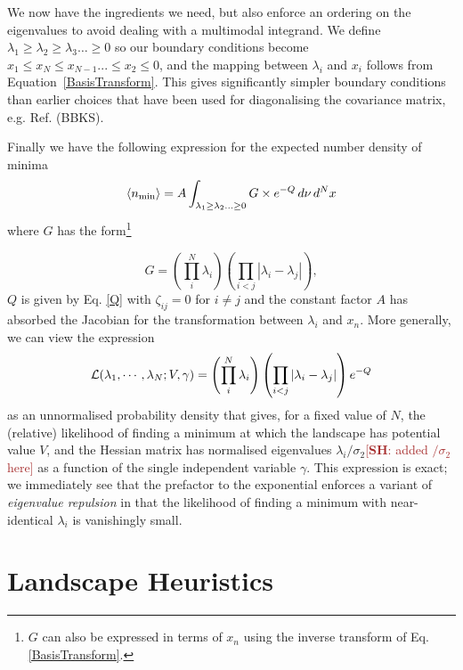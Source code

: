 \documentclass[12pt]{article}
\newcommand{\SH}[1]{\textcolor{brown}{[{\bf SH}: #1]}}
\begin{document}
We now have  the ingredients we  need, but  also enforce an ordering on the eigenvalues to avoid dealing with a multimodal integrand.  We define  $\lambda_1 \geq \lambda_2 \geq \lambda_3 \ldots \geq 0$ so our boundary conditions become $x_1\leq x_N\leq x_{N-1} ... \leq x_2 \leq 0$, and the mapping between $\lambda_i$ and $x_i$  follows from Equation~\ref{BasisTransform}. This gives significantly simpler boundary conditions than earlier choices that have been used for diagonalising the covariance matrix, e.g. Ref.\cite{BBKS} (BBKS).

Finally we have the following expression for the expected number density of minima 
%
\begin{equation} \label{DensityOfPeaks}
\langle n_{{\rm min}} \rangle = A \int_{\lambda_1 \geq \lambda_2 \ldots \geq 0} G \times e^{-Q} \, d\nu \,d^Nx
\end{equation}
%
\noindent where $G$ has the form\footnote{$G$ can also be expressed in terms of $x_n$ using the inverse transform of Eq. \ref{BasisTransform}.}

\begin{equation}
G = \left(\prod_{i}^{N} \lambda_i \right)\left(\prod_{i<j} |\lambda_i-\lambda_j|\right),
\end{equation} 
%
$Q$ is given by Eq. \ref{Q} with $\zeta_{ij}=0$ for $i\neq j$ and the constant factor $A$ has absorbed the Jacobian for the transformation between $\lambda_i$ and $x_n$. More generally, we can view the expression
%
\begin{equation}
{\cal L}(\lambda_1,\cdots, \lambda_N; V, \gamma) = \left(\prod_{i}^{N} \lambda_i \right)\left(\prod_{i<j} |\lambda_i-\lambda_j|\right) e^{-Q}
\end{equation} 
%
as an unnormalised probability density that gives, for a fixed value of $N$, the (relative) likelihood of finding a minimum at which the landscape has potential value $V$, and the Hessian matrix has normalised eigenvalues $\lambda_i/\sigma_2$\SH{added  $/\sigma_2$ here} as a function of the single independent variable $\gamma$. This expression is exact;  we immediately see that the prefactor to the exponential enforces a variant of {\em eigenvalue repulsion\/} \cite{Mehta1990}  in that the likelihood of finding a minimum with near-identical $\lambda_i$ is vanishingly small. 



\section{Landscape Heuristics}
\end{document}
